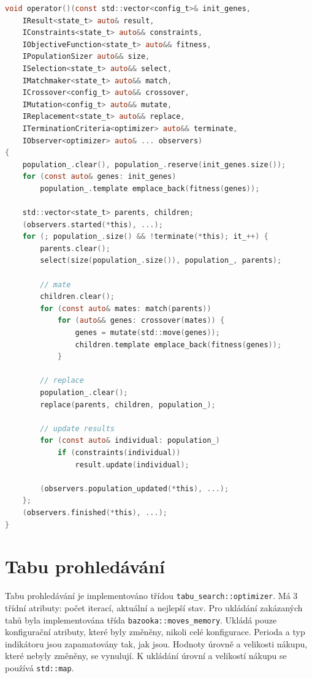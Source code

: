 \begin{lstlisting}[caption={~Implementace genetického algoritmu},label={lst:genetic:algorithm},captionpos=t,abovecaptionskip=-\medskipamount,belowcaptionskip=\medskipamount,language=C]
void operator()(const std::vector<config_t>& init_genes,
    IResult<state_t> auto& result,
    IConstraints<state_t> auto&& constraints,
    IObjectiveFunction<state_t> auto&& fitness,
    IPopulationSizer auto&& size,
    ISelection<state_t> auto&& select,
    IMatchmaker<state_t> auto&& match,
    ICrossover<config_t> auto&& crossover,
    IMutation<config_t> auto&& mutate,
    IReplacement<state_t> auto&& replace,
    ITerminationCriteria<optimizer> auto&& terminate,
    IObserver<optimizer> auto& ... observers)
{
    population_.clear(), population_.reserve(init_genes.size());
    for (const auto& genes: init_genes)
        population_.template emplace_back(fitness(genes));

    std::vector<state_t> parents, children;
    (observers.started(*this), ...);
    for (; population_.size() && !terminate(*this); it_++) {
        parents.clear();
        select(size(population_.size()), population_, parents);

        // mate
        children.clear();
        for (const auto& mates: match(parents))
            for (auto&& genes: crossover(mates)) {
                genes = mutate(std::move(genes));
                children.template emplace_back(fitness(genes));
            }

        // replace
        population_.clear();
        replace(parents, children, population_);

        // update results
        for (const auto& individual: population_)
            if (constraints(individual))
                result.update(individual);

        (observers.population_updated(*this), ...);
    };
    (observers.finished(*this), ...);
}
\end{lstlisting}

\section{Tabu prohledávání}
Tabu prohledávání je implementováno třídou \texttt{tabu\_search::optimizer}.
Má 3 třídní atributy: počet iterací, aktuální a nejlepší stav.
Pro ukládání zakázaných tahů byla implementována třída \texttt{bazooka::moves\_memory}.
Ukládá pouze konfigurační atributy, které byly změněny, nikoli celé konfigurace.
Perioda a typ indikátoru jsou zapamatovány tak, jak jsou.
Hodnoty úrovně a velikosti nákupu, které nebyly změněny, se vynulují.
K ukládání úrovní a velikostí nákupu se používá \texttt{std::map}.

